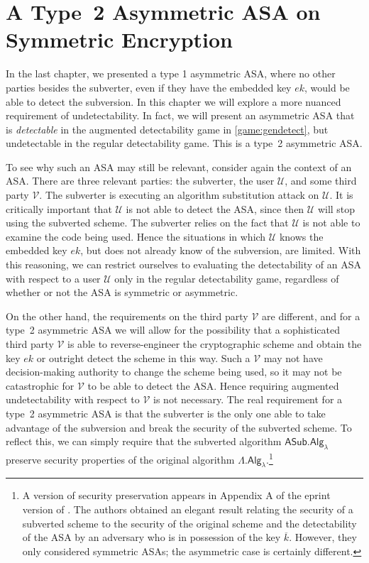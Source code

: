 \chapter{A Type~2 Asymmetric ASA on Symmetric Encryption} \label{sec:asymASA2}

In the last chapter, we presented a type 1 asymmetric ASA, where no other parties besides the subverter, even if they have the embedded key $ek$, would be able to detect the subversion. In this chapter we will explore a more nuanced requirement of undetectability. In fact, we will present an asymmetric ASA that is \emph{detectable} in the augmented detectability game in \autoref{game:gendetect}, but undetectable in the regular detectability game. This is a type~2 asymmetric ASA.

To see why such an ASA may still be relevant, consider again the context of an ASA. There are three relevant parties: the subverter, the user $\mathcal{U}$, and some third party $\mathcal{V}$. The subverter is executing an algorithm substitution attack on $\mathcal{U}$. It is critically important that $\mathcal{U}$ is not able to detect the ASA, since then $\mathcal{U}$ will stop using the subverted scheme. The subverter relies on the fact that $\mathcal{U}$ is not able to examine the code being used. Hence the situations in which $\mathcal{U}$ knows the embedded key $ek$, but does not already know of the subversion, are limited. With this reasoning, we can restrict ourselves to evaluating the detectability of an ASA with respect to a user $\mathcal{U}$ only in the regular detectability game, regardless of whether or not the ASA is symmetric or asymmetric.

On the other hand, the requirements on the third party $\mathcal{V}$ are different, and for a type~2 asymmetric ASA we will allow for the possibility that a sophisticated third party $\mathcal{V}$ is able to reverse-engineer the cryptographic scheme and obtain the key $ek$ or outright detect the scheme in this way. Such a $\mathcal{V}$ may not have decision-making authority to change the scheme being used, so it may not be catastrophic for $\mathcal{V}$ to be able to detect the ASA. Hence requiring augmented undetectability with respect to $\mathcal{V}$ is not necessary. The real requirement for a type~2 asymmetric ASA is that the subverter is the only one able to take advantage of the subversion and break the security of the subverted scheme. To reflect this, we can simply require that the subverted algorithm $\mathsf{ASub.Alg_\lambda}$ preserve security properties of the original algorithm $\mathsf{\Lambda.Alg_\lambda}$.\footnote{A version of security preservation appears in Appendix A of the eprint version of \cite{FSE:DegFarPoe15}. The authors obtained an elegant result relating the security of a subverted scheme to the security of the original scheme and the detectability of the ASA by an adversary who is in possession of the key $\overline{k}$. However, they only considered symmetric ASAs; the asymmetric case is certainly different.}


